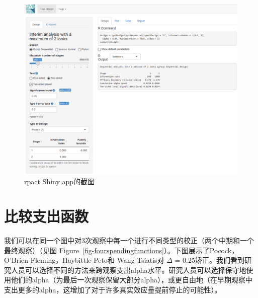 \documentclass[
  letterpaper,
  DIV=11,
  numbers=noendperiod]{scrreprt}
\begin{document}
\begin{figure}

{\centering \includegraphics[width=1\textwidth,height=\textheight]{images/rpact1.png}

}

\caption{\label{fig-rpactshiny}rpact Shiny app的截图}

\end{figure}

\hypertarget{ux6bd4ux8f83ux652fux51faux51fdux6570}{%
\section{比较支出函数}\label{ux6bd4ux8f83ux652fux51faux51fdux6570}}

我们可以在同一个图中对3次观察中每一个进行不同类型的校正（两个中期和一个最终观察）（见图
Figure~\ref{fig-fourspendingfunctions}）。下图展示了Pocock，O'Brien-Fleming，Haybittle-Peto和
Wang-Tsiatis对 \(\Delta\) =
0.25矫正。我们看到研究人员可以选择不同的方法来跨观察支出alpha水平。研究人员可以选择保守地使用他们的alpha（为最后一次观察保留大部分alpha），或更自由地（在早期观察中支出更多的alpha，这增加了对于许多真实效应量提前停止的可能性）。
\end{document}
